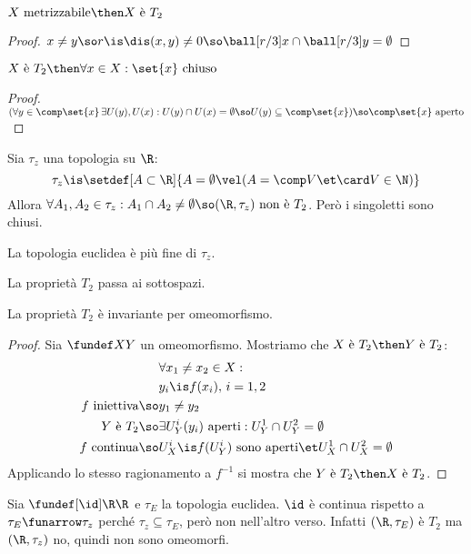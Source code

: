 \begin{prop}
$X\text{ metrizzabile}\then X\text{ è }T_2$
\end{prop}
\begin{proof}
$x\neq y\so r\is\dis(x,y)\neq 0\so\ball[r/3]x\cap\ball[r/3]y=\emptyset$
\end{proof}

\begin{prop}
$X\text{ è }T_2\then\forall x\in X:\set{x}\text{ chiuso}$
\end{prop}
\begin{proof}
$(\forall y\in\comp\set{x}\,\exists U(y),U(x):U(y)\cap U(x)=\emptyset\so U(y)\subseteq\comp\set{x})\so\comp\set{x}\text{ aperto}$
\end{proof}

\begin{es}
Sia $\tau_z$ una topologia su $\R$:
\[\tau_z\is\setdef[A\subset\R]{A=\emptyset\vel(A=\comp V\et\card V\in\N)}\]
Allora $\forall A_1,A_2\in\tau_z:A_1\cap A_2\neq\emptyset\so(\R,\tau_z)\text{ non è }T_2$. Però i singoletti sono chiusi.
\end{es}

\begin{oss}
La topologia euclidea è più fine di $\tau_z$.
\end{oss}

\begin{prop}
La proprietà $T_2$ passa ai sottospazi.
\end{prop}

\begin{prop}
La proprietà $T_2$ è invariante per omeomorfismo.
\end{prop}
\begin{proof}
Sia $\fundef XY$ un omeomorfismo. Mostriamo che $X\text{ è }T_2\then Y\text{ è }T_2$:
\begin{align*}
&\forall x_1\neq x_2\in X:\\
&y_i\is f(x_i),\,i=1,2\\
f\text{ iniettiva}\so&y_1\neq y_2\\
Y\text{ è }T_2\so&\exists U_Y^i(y_i)\text{ aperti}:U_Y^1\cap U_Y^2=\emptyset\\
f\text{ continua}\so&U_X^i\is f(U_Y^i)\text{ sono aperti}\et U_X^1\cap U_X^2=\emptyset
\end{align*}
Applicando lo stesso ragionamento a $f^{-1}$ si mostra che $Y\text{ è }T_2\then X\text{ è }T_2$.
\end{proof}

\begin{es}
Sia $\fundef[\id]\R\R$ e $\tau_E$ la topologia euclidea. $\id$ è continua rispetto a $\tau_E\funarrow\tau_z$ perché $\tau_z\subseteq\tau_E$, però non nell'altro verso. Infatti $(\R,\tau_E)$ è $T_2$ ma $(\R,\tau_z)$ no, quindi non sono omeomorfi.
\end{es}

